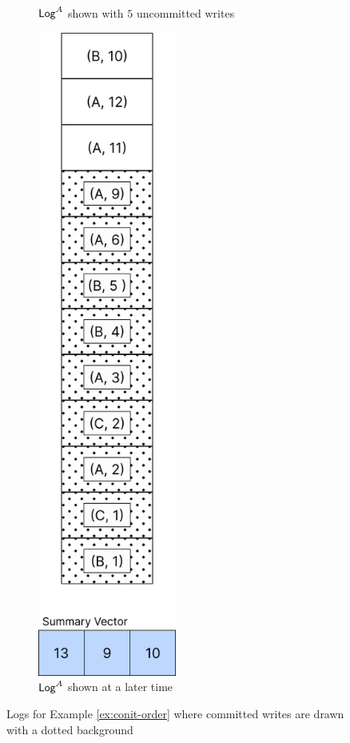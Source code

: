 \documentclass[]             %
{NASA}                       %
\theoremstyle{definition}
\begin{document}
\begin{figure}
\begin{subfigure}{0.5\textwidth}
    \caption{$\mathsf{Log}^{A}$ shown with $5$ uncommitted writes}
    \label{fig:conit-order-a}
  \end{subfigure}%
  \begin{subfigure}{0.5\textwidth}
    \centering
    \includegraphics[width=0.5\textwidth]{images/conit/Order2.png}
    \caption{$\mathsf{Log}^{A}$ shown at a later time}
    \label{fig:conit-order-b}
  \end{subfigure}
  \caption{Logs for Example \ref{ex:conit-order} where committed writes are drawn with a dotted background}
  \label{fig:conit-order}
\end{figure}
\end{document}
